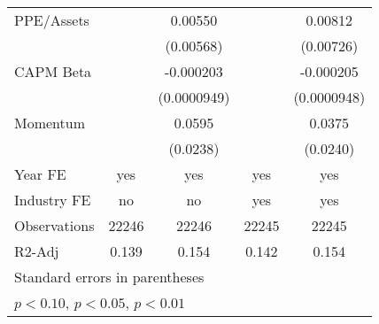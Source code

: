 {\begin{tabular}{l*{4}{c}}
PPE/Assets          &                     &     0.00550         &                     &     0.00812         \\
                    &                     &   (0.00568)         &                     &   (0.00726)         \\
CAPM Beta           &                     &   -0.000203\sym{**} &                     &   -0.000205\sym{**} \\
                    &                     & (0.0000949)         &                     & (0.0000948)         \\
Momentum            &                     &      0.0595\sym{**} &                     &      0.0375         \\
                    &                     &    (0.0238)         &                     &    (0.0240)         \\
\hline
Year FE             &         yes         &         yes         &         yes         &         yes         \\
Industry FE         &          no         &          no         &         yes         &         yes         \\
Observations        &       22246         &       22246         &       22245         &       22245         \\
R2-Adj              &       0.139         &       0.154         &       0.142         &       0.154         \\
\hline\hline
\multicolumn{5}{l}{\footnotesize Standard errors in parentheses}\\
\multicolumn{5}{l}{\footnotesize \sym{*} \(p<0.10\), \sym{**} \(p<0.05\), \sym{***} \(p<0.01\)}\\
\end{tabular}
}
